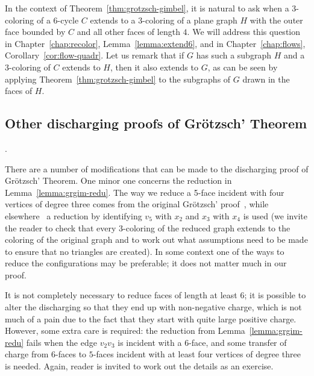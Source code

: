 \documentclass[12pt,twoside,openright,a4paper]{book}
\begin{document}
In the context of Theorem~\ref{thm:grotzsch-gimbel}, it is natural to ask when a $3$-coloring of a $6$-cycle $C$
extends to a $3$-coloring of a plane graph $H$ with the outer face bounded by $C$ and all other faces of length $4$.
We will address this question in Chapter~\ref{chap:recolor}, Lemma~\ref{lemma:extend6}, and in Chapter~\ref{chap:flows}, Corollary~\ref{cor:flow-quadr}.
Let us remark that if $G$ has such a subgraph $H$ and a $3$-coloring of $C$ extends to $H$, then it also extends
to $G$, as can be seen by applying Theorem~\ref{thm:grotzsch-gimbel} to the subgraphs of $G$ drawn in the faces of $H$.

\subsection{Other discharging proofs of Gr\"otzsch' Theorem}.

There are a number of modifications that can be made to the discharging proof of Gr\"otzsch' Theorem.
One minor one concerns the reduction in Lemma~\ref{lemma:grgim-redu}. The way we reduce a 5-face incident with
four vertices of degree three comes from the original Gr\"otzsch' proof~\cite{grotzsch1959}, while
elsewhere~\cite{thom-torus} a reduction by identifying $v_5$ with $x_2$ and $x_3$ with $x_4$ is used
(we invite the reader to check that every $3$-coloring of the reduced graph extends to the coloring
of the original graph and to work out what assumptions need to be made to ensure that no triangles are created).
In some context one of the ways to reduce the configurations may be preferable; it does not matter much in our
proof.

It is not completely necessary to reduce faces of length at least 6; it is possible to
alter the discharging so that they end up with non-negative charge, which is not much of a pain due to the
fact that they start with quite large positive charge.  However, some extra care is required: the reduction
from Lemma~\ref{lemma:grgim-redu} fails when the edge $v_2v_3$ is incident with a $6$-face, and some transfer of
charge from $6$-faces to $5$-faces incident with at least four vertices of degree three is needed.
Again, reader is invited to work out the details as an exercise.
\end{document}
